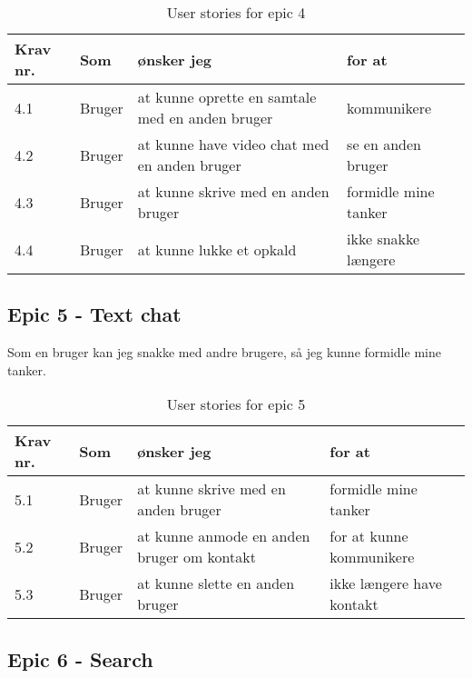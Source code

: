 \begin{table}[H]
    \centering
    \caption{User stories for epic 4}
    \label{tab:us-epic4}
    \begin{tabular}{l|l|l|l}
        \textbf{Krav nr.} & \textbf{Som} & \textbf{ønsker jeg}                             & \textbf{for at}      \\
        \hline
        4.1               & Bruger       & at kunne oprette en samtale med en anden bruger & kommunikere          \\
        \hline
        4.2               & Bruger       & at kunne have video chat med en anden bruger    & se en anden bruger   \\
        \hline
        4.3               & Bruger       & at kunne skrive med en anden bruger             & formidle mine tanker \\
        \hline
        4.4               & Bruger       & at kunne lukke et opkald                        & ikke snakke længere  \\
    \end{tabular}
\end{table}

\subsection{Epic 5 - Text chat}

Som en bruger kan jeg snakke med andre brugere, så jeg kunne formidle mine tanker.

\begin{table}[H]
    \centering
    \caption{User stories for epic 5}
    \label{tab:us-epic5}
    \begin{tabular}{l|l|l|l}
        \textbf{Krav nr.} & \textbf{Som} & \textbf{ønsker jeg}                        & \textbf{for at}           \\
        \hline
        5.1               & Bruger       & at kunne skrive med en anden bruger        & formidle mine tanker      \\
        \hline
        5.2               & Bruger       & at kunne anmode en anden bruger om kontakt & for at kunne kommunikere  \\
        \hline
        5.3               & Bruger       & at kunne slette en anden bruger            & ikke længere have kontakt \\
    \end{tabular}
\end{table}

\subsection{Epic 6 - Search}

